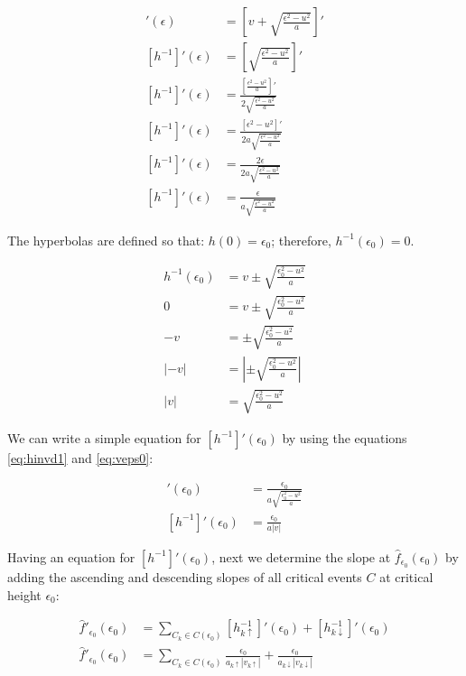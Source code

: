 \begin{align}
	[h^{-1}]'(\epsilon)  &= \left[ v + \sqrt{\frac{\epsilon^2 - u^2}{a}} \right]'\nonumber\\
	[h^{-1}]'(\epsilon) &= \left[\sqrt{\frac{\epsilon^2 - u^2}{a}} \right]'\nonumber\\
	[h^{-1}]'(\epsilon) &= \frac{ \left[ \frac{\epsilon^2 - u^2}{a} \right]' }{ 2\sqrt{\frac{\epsilon^2 - u^2}{a}} }\nonumber\\
	[h^{-1}]'(\epsilon) &= \frac{ \left[ \epsilon^2 - u^2 \right]' }{ 2a\sqrt{\frac{\epsilon^2 - u^2}{a}} }\nonumber\\
	[h^{-1}]'(\epsilon) &= \frac{ 2\epsilon }{ 2a\sqrt{\frac{\epsilon^2 - u^2}{a}} }\nonumber\\
	[h^{-1}]'(\epsilon)  &= \frac{ \epsilon }{ a\sqrt{\frac{\epsilon^2 - u^2}{a}} }\label{eq:hinvd1}
\end{align}

The hyperbolas are defined so that: $h(0) = \epsilon_0$; therefore, $h^{-1}(\epsilon_0) = 0$.

\begin{align}
	h^{-1}(\epsilon_0) &= v \pm \sqrt{\frac{\epsilon_0^2 - u^2}{a}}\nonumber\\
	0 &= v \pm \sqrt{\frac{\epsilon_0^2 - u^2}{a}}\nonumber\\
	-v &= \pm \sqrt{\frac{\epsilon_0^2 - u^2}{a}}\nonumber\\
	\left| -v \right| &= \left| \pm \sqrt{\frac{\epsilon_0^2 - u^2}{a}} \right|\nonumber\\
	\left| v \right| &= \sqrt{\frac{\epsilon_0^2 - u^2}{a}} \label{eq:veps0}
\end{align}

We can write a simple equation for $[h^{-1}]'(\epsilon_0)$ by using the equations \ref{eq:hinvd1} and \ref{eq:veps0}:

\begin{align}
	[h^{-1}]'(\epsilon_0)  &= \frac{ \epsilon_0 }{ a\sqrt{\frac{\epsilon_0^2 - u^2}{a}} }\nonumber\\
	[h^{-1}]'(\epsilon_0)  &= \frac{ \epsilon_0 }{ a \left| v \right| }\label{eq:hinvd1eps0}
\end{align}

Having an equation for $[h^{-1}]'(\epsilon_0)$, next we determine the slope at $\hat{f}_{\epsilon_0}(\epsilon_0)$ by adding the ascending and descending slopes of all critical events $C$ at critical height $\epsilon_0$:

\begin{align*}
	\hat{f}'_{\epsilon_0}(\epsilon_0) &= \sum_{C_k \in C(\epsilon_0)} { [h_{k\uparrow}^{-1}]'(\epsilon_0) + [h_{k\downarrow}^{-1}]'(\epsilon_0)}\\
	\hat{f}'_{\epsilon_0}(\epsilon_0) &= \sum_{C_k \in C(\epsilon_0)} { \frac{\epsilon_0}{a_{k\uparrow} \left| v_{k\uparrow} \right|} + \frac{\epsilon_0}{a_{k\downarrow} \left| v_{k\downarrow} \right|}}
\end{align*}

